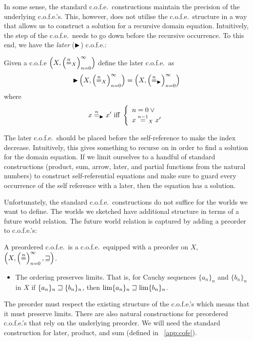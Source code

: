 \begin{jversion}
In some sense, the standard c.o.f.e.\ constructions maintain the precision of the underlying c.o.f.e.'s.
This, however, does not utilise the c.o.f.e.\ structure in a way that allows us to construct a solution for a recursive domain equation.
Intuitively, the step of the c.o.f.e.\ needs to go down before the recursive occurrence.
To this end, we have the \emph{later} ($\blater$) c.o.f.e.:
\begin{lemma}[$\blater$ c.o.f.e.]
  \label{def:later-cofe}
  Given a c.o.f.e $\left(X, \left(\nequal_X\right)_{n=0}^{\infty} \right)$ define the later c.o.f.e.\ as
  \[
    \blater\left(X, \left(\nequal_X\right)_{n=0}^{\infty} \right) = \left(X, \left(\nequal[n]_{\blater}\right)_{n=0}^{\infty} \right)
  \]
  where
  \[
    x \nequal[n]_{\blater} x' \text{ iff } \left\{
      \begin{array}{l}
        n = 0 \vee{}\\
        x \nequal[n-1]_X x'
      \end{array}
    \right.
  \]
\end{lemma}
The later c.o.f.e.\ should be placed before the self-reference to make the index decrease. 
Intuitively, this gives something to recurse on in order to find a solution for the domain equation.
If we limit ourselves to a handful of standard constructions (product, sum, arrow, later, and partial functions from the natural numbers) to construct self-referential equations and make sure to guard every occurrence of the self reference with a later, then the equation has a solution.

Unfortunately, the standard c.o.f.e.\ constructions do not suffice for the worlds we want to define.
The worlds we sketched have additional structure in terms of a future world relation.
The future world relation is captured by adding a preorder to c.o.f.e.'s:
\begin{definition}[Preordered c.o.f.e.]
  A preordered c.o.f.e.\ is a c.o.f.e.\ equipped with a preorder on $X$, $\left(X, \left(\nequal\right)_{n=0}^{\infty}, \future \right)$. 
  \begin{itemize}
  \item The ordering preserves limits. That is, for Cauchy sequences $\{a_n\}_n$ and $\{b_n\}_n$ in $X$ if $\{a_n\}_n \future\{b_n\}_n$, then $\lim \{a_n\}_n \future \lim \{b_n\}_n$.
  \end{itemize}
\end{definition}
The preorder must respect the existing structure of the c.o.f.e.'s which means that it must preserve limits.
There are also natural constructions for preordered c.o.f.e.'s that rely on the underlying preorder.
We will need the standard construction for later, product, and sum (defined in \appendixname~\ref{app:cofe}).


\end{jversion}
